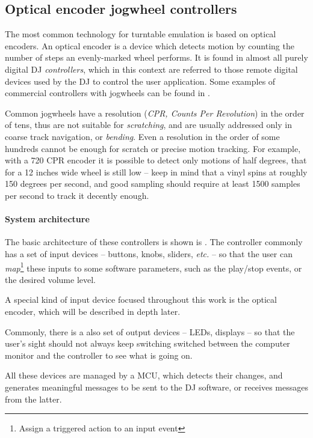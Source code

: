 \documentclass[a4paper,10pt]{article}
\begin{document}
\begin{multicols}{2}
\subsection{Optical encoder jogwheel controllers}

The most common technology for turntable emulation is based on optical encoders.
An optical encoder is a device which detects motion by counting the number of
steps an evenly-marked wheel performs. It is found in almost all purely digital
DJ \emph{controllers}, which in this context are referred to those remote
digital devices used by the DJ to control the user application. Some examples
of commercial controllers with jogwheels can be found in \cite{eks_op}
\cite{pioneer_ddjs1} \cite{vestax_vci400}.

Common jogwheels have a resolution (\emph{CPR, Counts Per Revolution}) in the
order of tens, thus are not suitable for \emph{scratching}, and are usually
addressed only in coarse track navigation, or \emph{bending}.
Even a resolution in the order of some hundreds cannot be enough for scratch
or precise motion tracking. For example, with a 720 CPR encoder it is possible
to detect only motions of half degrees, that for a 12 inches wide wheel is
still low -- keep in mind that a vinyl spins at roughly 150 degrees per second,
and good sampling should require at least 1500 samples per second to track it
decently enough.


\paragraph{System architecture}
The basic architecture of these controllers is shown is .
The controller commonly has a set of input devices -- buttons, knobs,
sliders, \emph{etc.} -- so that the user can \emph{map}\footnote{
	Assign a triggered action to an input event
} these inputs to some software parameters, such as the play/stop events, or
the desired volume level.

A special kind of input device focused throughout this work is the optical
encoder, \TODO which will be described in depth later.

Commonly, there is a also set of output devices -- LEDs, displays -- so that
the user's sight should not always keep switching switched between the computer
monitor and the controller to see what is going on.

All these devices are managed by a MCU, which detects their changes, and
generates meaningful messages to be sent to the DJ software, or receives
messages from the latter.


\end{multicols}
\end{document}

